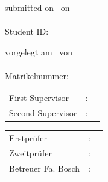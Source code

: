 \begin{titlepage}
	\vfill
	
	\ifdefined\ThesisLanguageIsEnglish 
  		\begin{center}
    			\Large submitted on \ThesisDeliveryDate\ on\\
    			\vspace{0.3cm}
    			\Large \textbf{\myName}\\
    			\vspace{0.3cm}
    			\normalsize Student ID: \myStudentId
  		\end{center}
  	\else
		\begin{center}
			\Large vorgelegt am \ThesisDeliveryDate\ von\\
			\vspace{0.3cm}
			\Large \textbf{\myName}\\
			\vspace{0.3cm}
			\normalsize Matrikelnummer: \myStudentId
		\end{center}
  	\fi
	
	\vfill
	
	\ifdefined\ThesisLanguageIsEnglish 
		\begin{center}
			\begin{tabular}{lll}
				First Supervisor    & : & \Supervisor \\     %
				Second Supervisor & : & \CoSupervisor\\    %
			\end{tabular}
		\end{center}
	\else
		\begin{center}
			\begin{tabular}{lll}
				Erstprüfer    		& : & \Supervisor \\     %
				Zweitprüfer			& : & \CoSupervisor\\    %
				Betreuer Fa. Bosch 	& : & \CompSupervisor\\    %
			\end{tabular}
		\end{center} 
	\fi
	
	\newpage
	
\end{titlepage}
 
